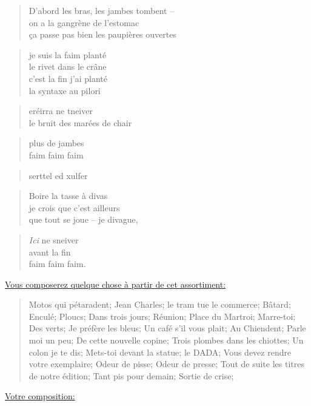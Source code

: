   \begin{verse}
    D’abord les bras, les jambes tombent --\\
    on a la gangrène de l’estomac\\
    ça passe pas bien les paupières ouvertes
  \end{verse}
  \begin{verse}
    je suis la faim planté\\
    le rivet dans le crâne\\
    c’est la fin j’ai planté\\
    la syntaxe au pilori
  \end{verse}
  \begin{verse}
    eréirra ne tneiver\\
    le bruit des marées de chair
  \end{verse}
  \begin{verse}
    plus de jambes\\
    faim faim faim
  \end{verse}
  \begin{verse}
    serttel ed xulfer
  \end{verse}
  \begin{verse}
    Boire la tasse à divas\\
    je crois que c’est ailleurs\\
    que tout se joue -- je divague, 
  \end{verse}
  \begin{verse}
    \emph{Ici} ne sneiver\\
    avant la fin \\
    faim faim faim.
  \end{verse}

\newpage
{}
  \begin{flushleft}
    \underline{Vous composerez quelque chose à partir de cet assortiment:}
  \end{flushleft}
  \begin{quote}
    Motos qui pétaradent; Jean Charles; le tram tue le commerce; Bâtard; Enculé;
    Ploucs; Dans trois jours; Réunion; Place du Martroi; Marre-toi; Des verts;
    Je préfère les bleus; Un café s’il vous plait; Au Chiendent; Parle moi un peu;
    De cette nouvelle copine; Trois plombes dans les chiottes; Un colon je te dis;
    Mets-toi devant la statue; le DADA; Vous devez rendre votre exemplaire;
    Odeur de pisse; Odeur de presse; Tout de suite les titres de notre édition;
    Tant pis pour demain; Sortie de crise;
  \end{quote}
  \begin{flushleft}
    \underline{Votre composition:}
  \end{flushleft}

